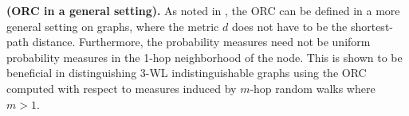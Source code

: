 \begin{rmk}\label{moregeneral-orc-graphs} \textbf{(ORC in a general setting).} As noted in \citep{southern2023expressive}, the ORC can be defined in a more general setting on graphs, where the metric $d$ does not have to be the shortest-path distance. Furthermore, the probability measures need not be uniform probability measures in the 1-hop neighborhood of the node. This is shown to be beneficial in distinguishing 3-WL indistinguishable graphs using the ORC computed with respect to measures induced by $m$-hop random walks where $m>1$.
\end{rmk}